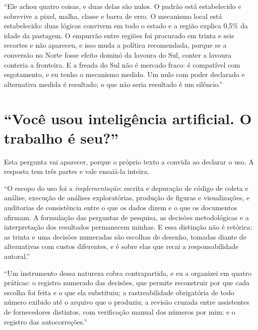 \begin{nabanca}
``Ele achou quatro coisas, e duas delas são nulos. O padrão está estabelecido e
sobrevive a pixel, malha, classe e barra de erro. O mecanismo local está
estabelecido: duas lógicas convivem em todo o estado e a região explica 0,5\% da
idade da pastagem. O empurrão entre regiões foi procurado em trinta e seis
recortes e não apareceu, e isso muda a política recomendada, porque se a
conversão no Norte fosse efeito dominó da lavoura do Sul, conter a lavoura
conteria a fronteira. E a freada do Sul não é mercado fraco: é compatível com
esgotamento, e eu tenho o mecanismo medido. Um nulo com poder declarado e
alternativa medida é resultado; o que não seria resultado é um silêncio.''
\end{nabanca}

\section{``Você usou inteligência artificial. O trabalho é seu?''}

Esta pergunta vai aparecer, porque o próprio texto a convida ao declarar o uso.
A resposta tem três partes e vale ensaiá-la inteira.

\begin{nabanca}
``O escopo do uso foi a \emph{implementação}: escrita e depuração de código de
coleta e análise, execução de análises exploratórias, produção de figuras e
visualizações, e auditorias de consistência entre o que os dados dizem e o que
os documentos afirmam. A formulação das perguntas de pesquisa, as decisões
metodológicas e a interpretação dos resultados permanecem minhas. E essa
distinção não é retórica: as trinta e uma decisões numeradas são escolhas de
desenho, tomadas diante de alternativas com custos diferentes, e é sobre elas
que recai a responsabilidade autoral.''
\end{nabanca}

\begin{nabanca}
``Um instrumento dessa natureza cobra contrapartida, e eu a organizei em quatro
práticas: o registro numerado das decisões, que permite reconstruir por que cada
escolha foi feita e o que ela substituiu; a rastreabilidade obrigatória de todo
número exibido até o arquivo que o produziu; a revisão cruzada entre assistentes
de fornecedores distintos, com verificação manual dos números por mim; e o
registro das autocorreções.''
\end{nabanca}

